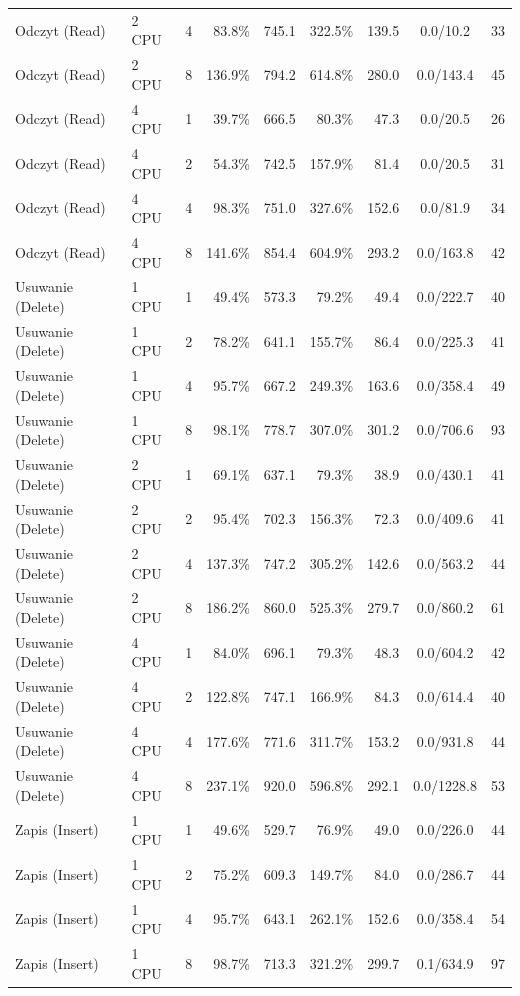 \begin{table}[ht]
{\begin{tabular}{llcrrrrcc}
Odczyt (Read) & 2 CPU & 4 & 83.8\% & 745.1 & 322.5\% & 139.5 & 0.0/10.2 & 33 \\
Odczyt (Read) & 2 CPU & 8 & 136.9\% & 794.2 & 614.8\% & 280.0 & 0.0/143.4 & 45 \\
Odczyt (Read) & 4 CPU & 1 & 39.7\% & 666.5 & 80.3\% & 47.3 & 0.0/20.5 & 26 \\
Odczyt (Read) & 4 CPU & 2 & 54.3\% & 742.5 & 157.9\% & 81.4 & 0.0/20.5 & 31 \\
Odczyt (Read) & 4 CPU & 4 & 98.3\% & 751.0 & 327.6\% & 152.6 & 0.0/81.9 & 34 \\
Odczyt (Read) & 4 CPU & 8 & 141.6\% & 854.4 & 604.9\% & 293.2 & 0.0/163.8 & 42 \\
Usuwanie (Delete) & 1 CPU & 1 & 49.4\% & 573.3 & 79.2\% & 49.4 & 0.0/222.7 & 40 \\
Usuwanie (Delete) & 1 CPU & 2 & 78.2\% & 641.1 & 155.7\% & 86.4 & 0.0/225.3 & 41 \\
Usuwanie (Delete) & 1 CPU & 4 & 95.7\% & 667.2 & 249.3\% & 163.6 & 0.0/358.4 & 49 \\
Usuwanie (Delete) & 1 CPU & 8 & 98.1\% & 778.7 & 307.0\% & 301.2 & 0.0/706.6 & 93 \\
Usuwanie (Delete) & 2 CPU & 1 & 69.1\% & 637.1 & 79.3\% & 38.9 & 0.0/430.1 & 41 \\
Usuwanie (Delete) & 2 CPU & 2 & 95.4\% & 702.3 & 156.3\% & 72.3 & 0.0/409.6 & 41 \\
Usuwanie (Delete) & 2 CPU & 4 & 137.3\% & 747.2 & 305.2\% & 142.6 & 0.0/563.2 & 44 \\
Usuwanie (Delete) & 2 CPU & 8 & 186.2\% & 860.0 & 525.3\% & 279.7 & 0.0/860.2 & 61 \\
Usuwanie (Delete) & 4 CPU & 1 & 84.0\% & 696.1 & 79.3\% & 48.3 & 0.0/604.2 & 42 \\
Usuwanie (Delete) & 4 CPU & 2 & 122.8\% & 747.1 & 166.9\% & 84.3 & 0.0/614.4 & 40 \\
Usuwanie (Delete) & 4 CPU & 4 & 177.6\% & 771.6 & 311.7\% & 153.2 & 0.0/931.8 & 44 \\
Usuwanie (Delete) & 4 CPU & 8 & 237.1\% & 920.0 & 596.8\% & 292.1 & 0.0/1228.8 & 53 \\
Zapis (Insert) & 1 CPU & 1 & 49.6\% & 529.7 & 76.9\% & 49.0 & 0.0/226.0 & 44 \\
Zapis (Insert) & 1 CPU & 2 & 75.2\% & 609.3 & 149.7\% & 84.0 & 0.0/286.7 & 44 \\
Zapis (Insert) & 1 CPU & 4 & 95.7\% & 643.1 & 262.1\% & 152.6 & 0.0/358.4 & 54 \\
Zapis (Insert) & 1 CPU & 8 & 98.7\% & 713.3 & 321.2\% & 299.7 & 0.1/634.9 & 97 \\

\end{tabular}}
\end{table}
